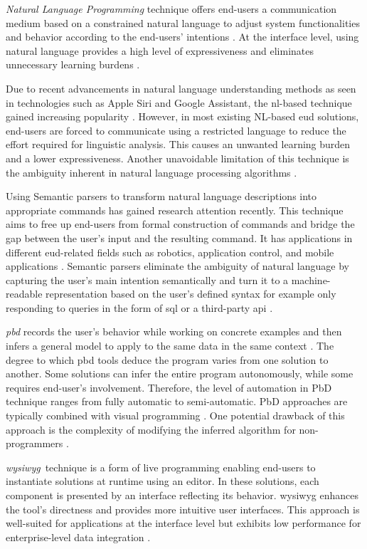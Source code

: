 \emph{Natural Language Programming} technique offers end-users
a communication medium based on a constrained natural language to adjust
system functionalities and behavior according to the
end-users' intentions \autocite{Myers2004}. At the
interface level, using natural language provides a high level of
expressiveness and eliminates unnecessary learning burdens \autocite{Tam1998}.

Due to recent advancements in natural language understanding methods as
seen in technologies such as Apple Siri and Google Assistant, the
\gls{nl}-based technique gained increasing popularity \autocite{Barricelli2019}. However, in most existing NL-based \gls{eud} solutions, end-users
are forced to communicate using a restricted language to reduce the
effort required for linguistic analysis. This causes an unwanted
learning burden and a lower expressiveness. Another unavoidable
limitation of this technique is the ambiguity inherent in natural
language processing algorithms \autocite{Paterno2013}.

Using Semantic parsers to transform natural language descriptions into
appropriate commands has gained research attention recently. This
technique aims to free up end-users from formal construction of commands
and bridge the gap between the user's input and the resulting command.
It has applications in different \gls{eud}-related fields such as robotics,
application control, and mobile applications \autocite{Sales2018}. Semantic parsers eliminate the ambiguity of natural language by
capturing the user's main intention semantically and turn it to a
machine-readable representation based on the user's defined syntax for
example only responding to queries in the form of  \gls{sql} or a third-party
 \gls{api} \autocite{Liang2015}.

\emph{\gls{pbd}} records the user's
behavior while working on concrete examples and then infers a general
model to apply to the same data in the same context \autocite{Aghaee2014}. The degree to which \gls{pbd} tools deduce the program varies
from one solution to another. Some solutions can infer the entire
program autonomously, while some requires end-user's involvement.
Therefore, the level of automation in PbD technique ranges from fully
automatic to semi-automatic. PbD approaches are typically combined with
visual programming \autocite{Paterno2013}. One potential drawback of this
approach is the complexity of modifying the inferred algorithm for
non-programmers \autocite{Tschudnowsky2016}.

\emph{\gls{wysiwyg}}~technique is a
form of live programming enabling end-users to instantiate solutions at
runtime using an editor. In these solutions, each component is presented
by an interface reflecting its behavior. \gls{wysiwyg} enhances the
tool’s directness and provides more intuitive user
interfaces. This approach is well-suited for applications at the
interface level but exhibits low performance for enterprise-level data
integration \autocite{Daniel2014}.

